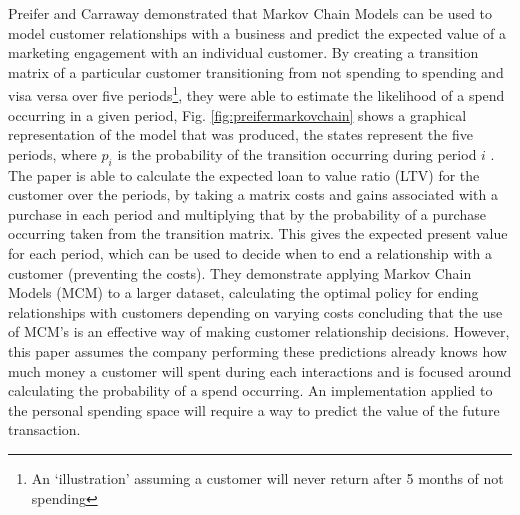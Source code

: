 Preifer and Carraway demonstrated that Markov Chain Models can be used to model customer relationships with a business and predict the expected value of a marketing engagement with an individual customer. By creating a transition matrix of a particular customer transitioning from not spending to spending and visa versa over five periods\footnote{An `illustration' assuming a customer will never return after 5 months of not spending}, they were able to estimate the likelihood of a spend occurring in a given period, Fig. \ref{fig:preifermarkovchain} shows a graphical representation of the model that was produced, the states represent the five periods, where $p_{i}$ is the probability of the transition occurring during period $i$ \cite{pfeifer2000modeling}.
% 
The paper is able to calculate the expected loan to value ratio (LTV) for the customer over the periods, by taking a matrix costs and gains associated with a purchase in each period and multiplying that by the probability of a purchase occurring taken from the transition matrix. This gives the expected present value for each period, which can be used to decide when to end a relationship with a customer (preventing the costs).
%
They demonstrate applying Markov Chain Models (MCM) to a larger dataset, calculating the optimal policy for ending relationships with customers depending on varying costs concluding that the use of MCM's is an effective way of making customer relationship decisions. However, this paper assumes the company performing these predictions already knows how much money a customer will spent during each interactions and is focused around calculating the probability of a spend occurring. An implementation applied to the personal spending space will require a way to predict the value of the future transaction.
 

